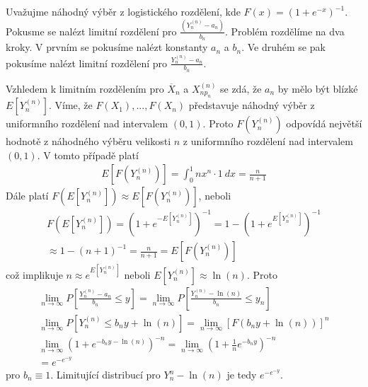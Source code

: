 \begin{example}
Uvažujme náhodný výběr z logistického rozdělení, kde $F(x) = (1 + e^{-x})^{-1}$. Pokusme se nalézt limitní rozdělení pro $\frac{(Y_n^{(n)} - a_n)}{b_n}$. Problém rozdělíme na dva kroky. V prvním se pokusíme nalézt konstanty $a_n$ a $b_n$. Ve druhém se pak pokusíme nalézt limitní rozdělení pro $\frac{Y_n^{(n)} - a_n}{b_n}$.

Vzhledem k limitním rozdělením pro $\overline{X}_n$ a $X_{n p_n}^{(n)}$ se zdá, že $a_n$ by mělo být blízké $E[Y_n^{(n)}]$. Víme, že $F(X_1), ..., F(X_n)$ představuje náhodný výběr z uniformního rozdělení nad intervalem $(0, 1)$. Proto $F(Y_n^{(n)})$ odpovídá největší hodnotě z náhodného výběru velikosti $n$ z uniformního rozdělení nad intervalem $(0, 1)$. V tomto případě platí
\begin{gather*}
E[F(Y_n^{(n)})] = \int_0^1 n x^n \cdot 1 ~ dx = \frac{n}{n + 1}
\end{gather*}
Dále platí $F(E[Y_n^{(n)}]) \approx E[F(Y_n^{(n)})]$, neboli
\begin{gather*}
F(E[Y_n^{(n)}]) = \left( 1 + e^{-E[Y_n^{(n)}]}\right)^{-1} = 1 -  \left( 1 + e^{E[Y_n^{(n)}]}\right)^{-1}\\
\approx 1 - (n + 1)^{-1} = \frac{n}{n + 1} = E[F(Y_n^{(n)})]
\end{gather*}
což implikuje $n \approx e^{E[Y_n^{(n)}]}$ neboli $E[Y_n^{(n)}] \approx \ln(n)$. Proto
\begin{gather*}
\lim_{n \rightarrow \infty} P \left[\frac{Y_n^{(n)} - a_n}{b_n} \le y \right] = \lim_{n \rightarrow \infty} P \left[ \frac{Y_n^{(n)} - \ln(n)}{b_n} \le  y_n \right]\\
\lim_{n \rightarrow \infty} P[Y_n^{(n)} \le b_ny + \ln(n)] = \lim_{n \rightarrow \infty} \left[F \left(b_ny + \ln(n)\right)\right]^n\\
\lim_{n \rightarrow \infty} \left(1 + e^{-b_ny - \ln(n)} \right)^{-n} = \lim_{n \rightarrow \infty} \left(1 + \frac{1}{n}e^{-b_n y} \right)^{-n}\\
= e^{-e^{-y}}
\end{gather*}
pro $b_n \equiv 1$. Limitující distribucí pro $Y_n^{n} - \ln(n)$ je tedy $e^{-e^{-y}}$. 
\end{example}
